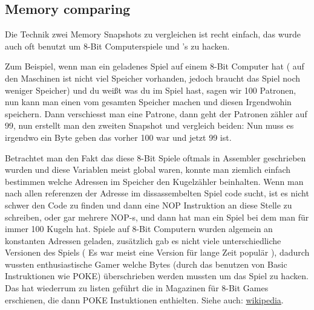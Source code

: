 \subsection{Memory  comparing}
\label{snapshots_comparing}

Die Technik zwei Memory Snapshots zu vergleichen ist recht einfach, das wurde auch oft benutzt um 8-Bit Computerspiele und
's  zu hacken.

Zum Beispiel, wenn man ein geladenes Spiel auf einem 8-Bit Computer hat ( auf den Maschinen ist nicht viel Speicher 
vorhanden, jedoch braucht das Spiel noch weniger Speicher) und du weißt was du im Spiel hast, sagen wir 100 Patronen, 
nun kann man einen  vom gesamten Speicher machen und diesen Irgendwohin speichern. Dann verschiesst man 
eine Patrone, dann geht der Patronen zähler auf 99, nun erstellt man den zweiten Snapshot und vergleich beiden: 
Nun muss es irgendwo ein Byte geben das vorher 100 war und jetzt 99 ist. 



Betrachtet man den Fakt das diese 8-Bit Spiele oftmals in Assembler geschrieben wurden und diese Variablen meist global 
waren, konnte man ziemlich einfach bestimmen welche Adressen im Speicher den Kugelzähler beinhalten. Wenn man nach allen 
referenzen der Adresse im dissassembelten Spiel code sucht, ist es nicht schwer den Code  
zu finden und dann eine \gls{NOP} Instruktion an diese Stelle zu schreiben, oder gar mehrere \gls{NOP}-s, und dann hat man 
ein Spiel bei dem man für immer 100 Kugeln hat. %
Spiele auf 8-Bit Computern wurden algemein an konstanten Adressen geladen, zusätzlich gab es nicht viele unterschiedliche
Versionen des Spiels (  Es war meist eine Version für lange Zeit populär ), dadurch wussten enthusiastische Gamer welche
Bytes (durch das benutzen von Basic Instruktionen wie \gls{POKE}) überschrieben werden mussten um das Spiel zu hacken. 
Das hat wiederrum zu  listen geführt die in Magazinen für 8-Bit Games erschienen, die dann \gls{POKE} Instuktionen enthielten.
Siehe auch: \href{http://go.yurichev.com/17114}{wikipedia}.


